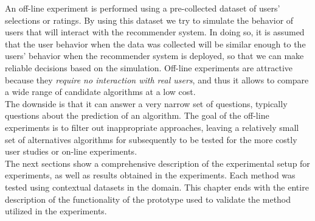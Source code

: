 An off-line experiment is performed using a pre-collected dataset
of users' selections or ratings. By using this dataset we try to simulate
the behavior of users that will interact with the recommender system. In
doing so, it is assumed that the user behavior when the data was collected
will be similar enough to the users' behavior when the recommender
system is deployed, so that we can make reliable decisions based on
the simulation.  Off-line experiments are attractive because they
\textit{require no interaction with real users}, and thus it allows to compare
a wide range of candidate algorithms at a low cost. \\ The downside is
that it can answer a very narrow set of questions, typically questions
about the prediction of an algorithm. The goal of the off-line
experiments is to filter out inappropriate  approaches, leaving a
relatively small set of alternatives algorithms for subsequently to be
tested for the more costly user studies or on-line 
experiments\cite{adomavicius2011context}.\\ 

The next sections show a comprehensive description of the 
experimental setup for experiments, as well as results obtained 
in the experiments. Each method was tested using contextual 
datasets in the domain.  This chapter ends with the entire 
description of the functionality of the prototype used to 
validate the method utilized in the experiments.

